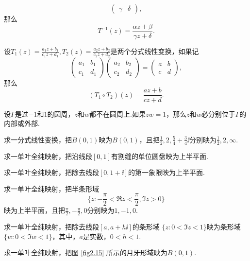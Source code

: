 \begin{xiti}
\[\begin{pmatrix}
      \gamma & \delta
      \end{pmatrix},
    \]
    那么
    \[
      T^{-1}(z) = \frac{\alpha z + \beta}{\gamma z + \delta}.
    \]
  \item 设$T_1(z)=\frac{a_1z+b_1}{c_1z+d_1},T_2(z)=\frac{a_2z+b_2}{c_2z+d_2}$是两个分式线性变换，如果记
    \[
      \begin{pmatrix}
        a_1 & b_1\\
        c_1 & d_1
      \end{pmatrix}
      \begin{pmatrix}
        a_2 & b_2 \\
        c_2 & d_2
      \end{pmatrix}
      = \begin{pmatrix}
      a & b \\
      c & d
      \end{pmatrix},
    \]
  那么
    \[
      (T_1\circ T_2)(z) = \frac{az+b}{cz+d}.
    \]
  \item 设$\Gamma$是过$-1$和$1$的圆周，$z$和$w$都不在圆周上.如果$zw=1$，那么$z$和$w$必分别位于$\Gamma$的内部或外部.
  \item 求一分式线性变换，把$B(0,1)$映为$B(0,1)$，且把$\frac12,2,\frac54+\frac34\ii$分别映为$\frac12,2,\infty$.
  \item 求一单叶全纯映射，把沿线段$[0,1]$有割缝的单位圆盘映为上半平面.
  \item 求一单叶全纯映射，把除去线段$[0,1+\ii]$的第一象限映为上半平面.
  \item 求一单叶全纯映射，把半条形域
    \[
      \bigg\{z:-\frac\pi2 < \Re z < \frac\pi2,\Im z > 0 \bigg\}
    \]
    映为上半平面，且把$\frac\pi2,-\frac\pi2,0$分别映为$1,-1,0$.
  \item 求一单叶全纯映射，把除去线段$[a,a+h\ii]$的条形域
     $\{z:0<\Im z<1\}$映为条形域$\{w:0<\Im w<1\}$，其中，$a$是实数，$0<h<1$.
  \item 求一单叶全纯映射，把图 \ref{fig2.15} 所示的月牙形域映为$B(0,1)$.
    \begin{figure}[!ht]
      \centering
      \begin{minipage}[b]{0.48\linewidth}
        \centering
\end{minipage}
\end{figure}
\end{xiti}
